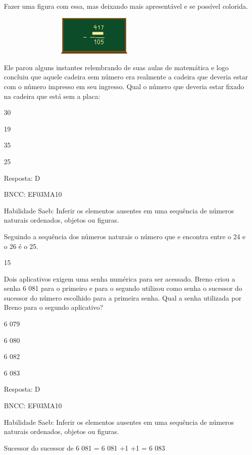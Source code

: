 \begin{escolha}
\begin{escolha}
Fazer uma figura com essa, mas deixando mais apresentável e se possível
colorida.

\includegraphics[width=3.87534in,height=0.76673in]{media/image122.png}

Ele parou alguns instantes relembrando de suas aulas de matemática e
logo concluiu que aquele cadeira sem número era realmente a cadeira que
deveria estar com o número impresso em seu ingresso. Qual o número que
deveria estar fixado na cadeira que está sem a placa:

\begin{escolha}
\item
  30
\item
  19
\item
  35
\item
  25
\end{escolha}

Resposta: D

BNCC: EF03MA10

Habilidade Saeb: Inferir os elementos ausentes em uma sequência de
números naturais ordenados, objetos ou figuras.

Seguindo a sequência dos números naturais o número que e encontra entre
o 24 e o 26 é o 25.

\num{15}

Dois aplicativos exigem uma senha numérica para ser acessado. Breno
criou a senha 6 081 para o primeiro e para o segundo utilizou como senha
o sucessor do sucessor do número escolhido para a primeira senha. Qual a
senha utilizada por Breno para o segundo aplicativo?

\begin{escolha}
\item
  6 079
\item
  6 080
\item
  6 082
\item
  6 083
\end{escolha}

Resposta: D

BNCC: EF03MA10

Habilidade Saeb: Inferir os elementos ausentes em uma sequência de
números naturais ordenados, objetos ou figuras.

Sucessor do sucessor de 6 081 = 6 081 +1 +1 = 6 083


\end{escolha}
\end{escolha}
